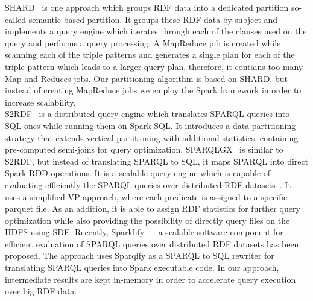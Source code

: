 SHARD~\cite{Rohloff2010SHARD} is one approach which groups RDF data into a dedicated partition so-called semantic-based partition.  
It groups these RDF data by subject and implements a query engine which iterates through each of the clauses used on the query and performs a query processing. 
A MapReduce job is created while scanning each of the triple patterns and generates a single plan for each of the triple pattern which leads to a larger query plan, therefore, it contains too many Map and Reduces jobs. 
Our partitioning algorithm is based on SHARD, but instead of creating MapReduce jobs we employ the Spark framework in order to increase scalability.
~\\
S2RDF~\cite{Schatzle:2016:SRQ:2977797.2977806} is a distributed query engine which translates SPARQL queries into SQL ones while running them on Spark-SQL. 
It introduces a data partitioning strategy that extends vertical partitioning with additional statistics, containing pre-computed semi-joins for query optimization.
SPARQLGX~\cite{sparqlgx-iswc-2016} is similar to S2RDF, but instead of translating SPARQL to SQL, it maps SPARQL into direct Spark RDD operations. 
It is a scalable query engine which is capable of evaluating efficiently the SPARQL queries over distributed RDF datasets~\cite{graux2018multi}.
It uses a simplified VP approach, where each predicate is assigned to a specific parquet file. 
As an addition, it is able to assign RDF statistics for further query optimization while also providing the possibility of directly query files on the HDFS using SDE.
Recently, Sparklify~\cite{2019-sansa-sparklify-iswc} -- a scalable software component for efficient evaluation of SPARQL queries over distributed RDF datasets has been proposed. 
The approach uses Sparqify as a SPARQL to SQL rewriter for translating SPARQL queries into Spark executable code.
In our approach, intermediate results are kept in-memory in order to accelerate query execution over big RDF data.